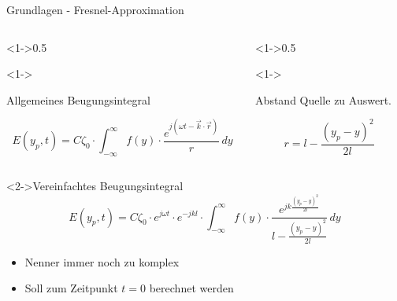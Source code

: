 \begin{frame}{Grundlagen - Fresnel-Approximation}
    \begin{columns}
        \begin{column}[t]<1->{0.5\textwidth}
            \begin{block}<1->{\strut Allgemeines Beugungsintegral}
                \begin{equation*}
                    E(y_p, t)
                    =
                    C\zeta_0 \cdot \int_{-\infty}^{\infty}f(y)\cdot\frac{e^{j(\omega t - \vec{k}\cdot\vec{r})}}{r} \,dy
                \end{equation*}
            \end{block}
        \end{column}
        \begin{column}[t]<1->{0.5\textwidth}
            \begin{block}<1->{\strut Abstand Quelle zu Auswert.}
                \begin{equation*}
                    r
                    =
                    l - \frac{(y_p-y)^2}{2l}
                \end{equation*}
            \end{block}
        \end{column}
    \end{columns}

    \begin{exampleblock}<2->{Vereinfachtes Beugungsintegral}
        \begin{equation*}
            E(y_p, t)
            =
            C\zeta_0 \cdot e^{j\omega t} \cdot e^{-jkl} \cdot \int_{-\infty}^{\infty}f(y)\cdot\frac{e^{jk\frac{(y_p-y)^2}{2l}}}{l - \frac{(y_p-y)^2}{2l}} \,dy
        \end{equation*}
        \begin{itemize}
            \item<3-> Nenner immer noch zu komplex
            \item<4-> Soll zum Zeitpunkt $t=0$ berechnet werden
        \end{itemize}

    \end{exampleblock}
\end{frame}

